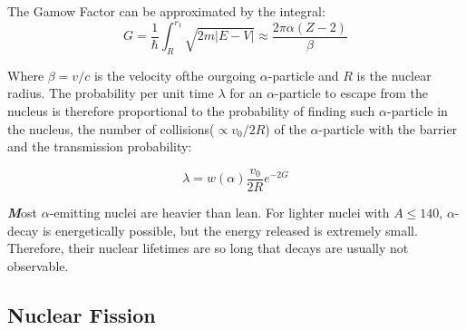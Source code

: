 \documentclass[10pt,a4paper]{article}
\newenvironment{callout}
	{\begin{calloutbox}\color{charcoal}\textbf\textit}
	{\end{calloutbox}}
\begin{document}
The Gamow Factor can be approximated by the integral:
\begin{equation}
    G = \frac{1}{\hbar}\int_R^{r_1} \sqrt{2m|E-V|} \approx \frac{2\pi\alpha(Z-2)}{\beta}
\end{equation}

Where $\beta = v/c$ is the velocity ofthe ourgoing $\alpha$-particle and $R$ is the nuclear radius. The probability per unit time $\lambda$ for an $\alpha$-particle to escape from the nucleus is therefore proportional to the probability of finding such $\alpha$-particle in the nucleus, the number of collisions($\propto v_0/2R$) of the $\alpha$-particle with the barrier and the transmission probability:

\begin{equation}
    \lambda = w(\alpha)\frac{v_0}{2R}e^{-2G}
\end{equation}

\begin{callout}
    Most $\alpha$-emitting nuclei are heavier than lean. For lighter nuclei with $A \leq 140$, $\alpha$-decay is energetically possible, but the energy released is extremely small. Therefore, their nuclear lifetimes are so long that decays are usually not observable.
\end{callout}

\subsection{Nuclear Fission}
\end{document}
